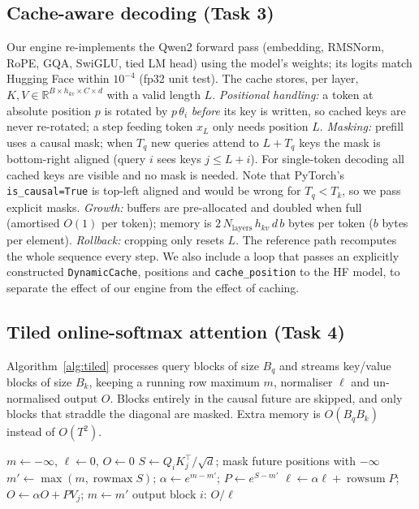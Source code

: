 \documentclass[conference]{IEEEtran}
\begin{document}
\subsection{Cache-aware decoding (Task 3)}
Our engine re-implements the Qwen2 forward pass (embedding, RMSNorm, RoPE, GQA, SwiGLU, tied LM head) using the model's weights; its logits match Hugging Face within $10^{-4}$ (fp32 unit test). The cache stores, per layer, $K,V\in\mathbb{R}^{B\times h_{kv}\times C\times d}$ with a valid length $L$. \emph{Positional handling:} a token at absolute position $p$ is rotated by $p\,\theta_i$ \emph{before} its key is written, so cached keys are never re-rotated; a step feeding token $x_L$ only needs position $L$. \emph{Masking:} prefill uses a causal mask; when $T_q$ new queries attend to $L+T_q$ keys the mask is bottom-right aligned (query $i$ sees keys $j\le L+i$). For single-token decoding all cached keys are visible and no mask is needed. Note that PyTorch's \texttt{is\_causal=True} is top-left aligned and would be wrong for $T_q<T_k$, so we pass explicit masks. \emph{Growth:} buffers are pre-allocated and doubled when full (amortised $O(1)$ per token); memory is $2\,N_{\text{layers}}\,h_{kv}\,d\,b$ bytes per token ($b$ bytes per element). \emph{Rollback:} cropping only resets $L$. The reference path recomputes the whole sequence every step. We also include a loop that passes an explicitly constructed \texttt{DynamicCache}, positions and \texttt{cache\_position} to the HF model, to separate the effect of our engine from the effect of caching.

\subsection{Tiled online-softmax attention (Task 4)}
Algorithm~\ref{alg:tiled} processes query blocks of size $B_q$ and streams key/value blocks of size $B_k$, keeping a running row maximum $m$, normaliser $\ell$ and un-normalised output $O$. Blocks entirely in the causal future are skipped, and only blocks that straddle the diagonal are masked. Extra memory is $O(B_qB_k)$ instead of $O(T^2)$.

\begin{algorithm}[t]\caption{Tiled attention with online softmax}\label{alg:tiled}\small
\begin{algorithmic}[1]
 \State $m\gets-\infty$, $\ell\gets 0$, $O\gets 0$
  \State $S\gets Q_iK_j^\top/\sqrt d$; mask future positions with $-\infty$
  \State $m'\gets\max(m,\operatorname{rowmax}S)$; $\alpha\gets e^{m-m'}$; $P\gets e^{S-m'}$
  \State $\ell\gets\alpha\ell+\operatorname{rowsum}P$; $O\gets\alpha O+PV_j$; $m\gets m'$
 \EndFor
 \State output block $i$: $O/\ell$
\EndFor
\end{algorithmic}\end{algorithm}
\end{document}
